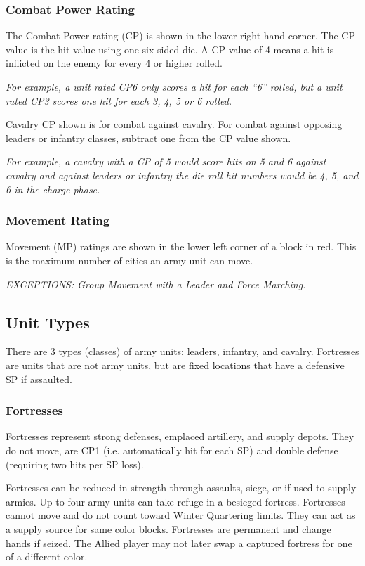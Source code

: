 \subsubsection{Combat Power Rating}

The Combat Power rating (CP) is shown in the lower right hand corner. The CP value is the hit value using one six sided die. A CP value of 4 means a hit is inflicted on the enemy for every 4 or higher rolled.

\textit{For example, a unit rated CP6 only scores a hit for each “6” rolled, but a unit rated CP3 scores one hit for each 3, 4, 5 or 6 rolled.}

Cavalry CP shown is for combat against cavalry. For combat against opposing leaders or infantry classes, subtract one from the CP value shown.

\textit{For example, a cavalry with a CP of 5 would score hits on 5 and 6 against cavalry and against leaders or infantry the die roll hit numbers would be 4, 5, and 6 in the charge phase.}

\subsubsection{Movement Rating}

Movement (MP) ratings are shown in the lower left corner of a block in red. This is the maximum number of cities an army unit can move.

\textit{EXCEPTIONS: Group Movement with a Leader and Force Marching.}

\subsection{Unit Types}
There are 3 types (classes) of army units: leaders, infantry, and cavalry. Fortresses are units that are not army units, but are fixed locations that have a defensive SP if assaulted.

\subsubsection{Fortresses}

Fortresses represent strong defenses, emplaced artillery, and supply depots. They do not move, are CP1 (i.e. automatically hit for each SP) and double defense (requiring two hits per SP loss).

Fortresses can be reduced in strength through assaults, siege, or if used to supply armies. Up to four army units can take refuge in a besieged fortress. Fortresses cannot move and do not count toward Winter Quartering limits. They can act as a supply source for same color blocks. Fortresses are permanent and change hands if seized. The Allied player may not later swap a captured fortress for one of a different color.

